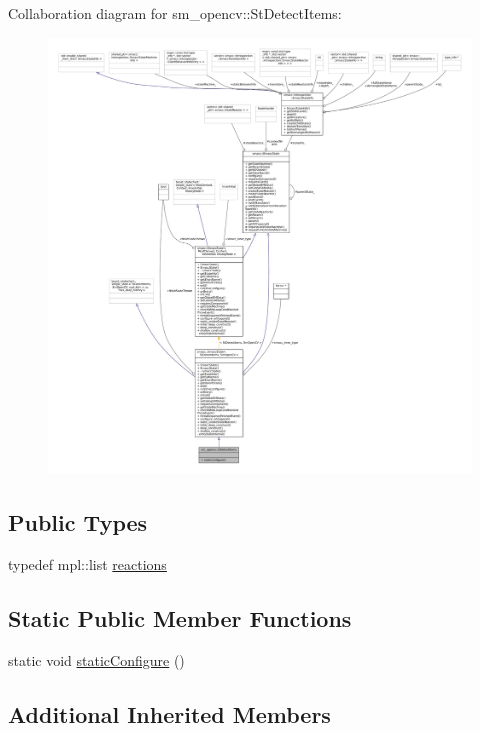 Collaboration diagram for sm\+\_\+opencv\+:\+:St\+Detect\+Items\+:
\nopagebreak
\begin{figure}[H]
\begin{center}
\leavevmode
\includegraphics[width=350pt]{structsm__opencv_1_1StDetectItems__coll__graph}
\end{center}
\end{figure}
\subsection*{Public Types}
\begin{DoxyCompactItemize}
\item 
typedef mpl\+::list \hyperlink{structsm__opencv_1_1StDetectItems_a2fc71705227453c12c6aa9b92df34dbf}{reactions}
\end{DoxyCompactItemize}
\subsection*{Static Public Member Functions}
\begin{DoxyCompactItemize}
\item 
static void \hyperlink{structsm__opencv_1_1StDetectItems_a9fc42d2adb3c0cb02300233880af2c6b}{static\+Configure} ()
\end{DoxyCompactItemize}
\subsection*{Additional Inherited Members}


